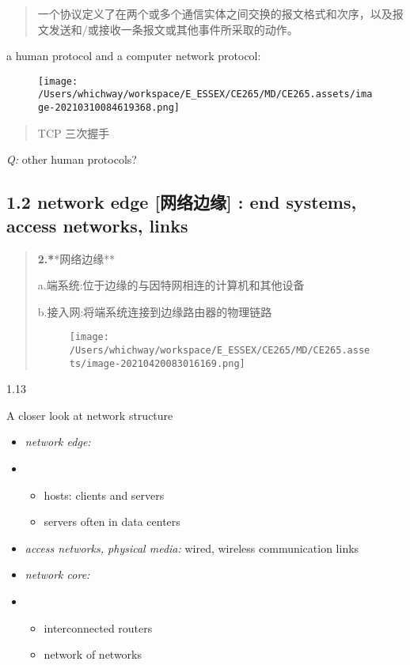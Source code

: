 \documentclass[
]{article}
\begin{document}
\begin{quote}
一个协议定义了在两个或多个通信实体之间交换的报文格式和次序，以及报文发送和/或接收一条报文或其他事件所采取的动作。
\end{quote}

a human protocol and a computer network protocol:

\begin{figure}
\centering
\texttt{[image: /Users/whichway/workspace/E\_ESSEX/CE265/MD/CE265.assets/image-20210310084619368.png]}
\caption{}
\end{figure}

\begin{quote}
TCP 三次握手🤝
\end{quote}

\emph{Q:} other human protocols?

\hypertarget{12-network-edge-ux7f51ux7edcux8fb9ux7f18--end-systems-access-networks-links}{%
\subsection{1.2 network edge {[}网络边缘{]} : end systems, access
networks,
links}\label{12-network-edge-ux7f51ux7edcux8fb9ux7f18--end-systems-access-networks-links}}

\begin{quote}
\textbf{2.*}*网络边缘**

a.端系统:位于边缘的与因特网相连的计算机和其他设备

b.接入网:将端系统连接到边缘路由器的物理链路

\begin{figure}
\centering
\texttt{[image: /Users/whichway/workspace/E\_ESSEX/CE265/MD/CE265.assets/image-20210420083016169.png]}
\caption{}
\end{figure}
\end{quote}

1.13

A closer look at network structure

\begin{itemize}
\item
  \emph{network edge:}
\item
  \begin{itemize}
  \item
    hosts: clients and servers
  \item
    servers often in data centers
  \end{itemize}
\item
  \emph{access networks, physical media:} wired, wireless communication
  links
\item
  \emph{network core:}
\item
  \begin{itemize}
  \item
    interconnected routers
  \item
    network of networks
  \end{itemize}
\end{itemize}
\end{document}

